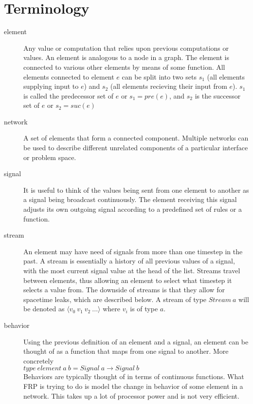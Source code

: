 \documentclass[twocolumn]{paper}
\begin{document}
\section{Terminology}
\begin{description}
\item[element] Any value or computation that relies upon previous computations or values. An element is analogous to a node in a graph. The element is connected to various other elements by means of some function. All elements connected to element $e$ can be split into two sets $s_1$ (all elements supplying input to $e$) and $s_2$ (all elements recieving their input from $e$). $s_1$ is called the predecessor set of $e$ or $s_1 = pre(e)$, and $s_2$ is the successor set of $e$ or $s_2 = suc(e)$

\item[network] A set of elements that form a connected component. Multiple networks can be used to describe different unrelated components of a particular interface or problem space.

\item[signal] It is useful to think of the values being sent from one element to another as a signal being broadcast continuously. The element receiving this signal adjusts its own outgoing signal according to a predefined set of rules or a function.

\item[stream] An element may have need of signals from more than one timestep in the past. A stream is essentially a history of all previous values of a signal, with the most current signal value at the head of the list. Streams travel between elements, thus allowing an element to select what timestep it selects a value from. The downside of streams is that they allow for spacetime leaks, which are described below. A stream of type $Stream~a$ will be denoted as $\langle v_0~v_1~v_2~...\rangle$ where $v_i$ is of type $
a$.

\item[behavior] Using the previous definition of an element and a signal, an element can be thought of as a function that maps from one signal to another. More concretely \\
  $type~element~a~b = Signal ~a \rightarrow Signal ~b$\\
  Behaviors are typically thought of in terms of continuous functions. What FRP is trying to do is model the change in behavior of some element in a network. This takes up a lot of processor power  and is not very efficient.


\end{description}
\end{document}
